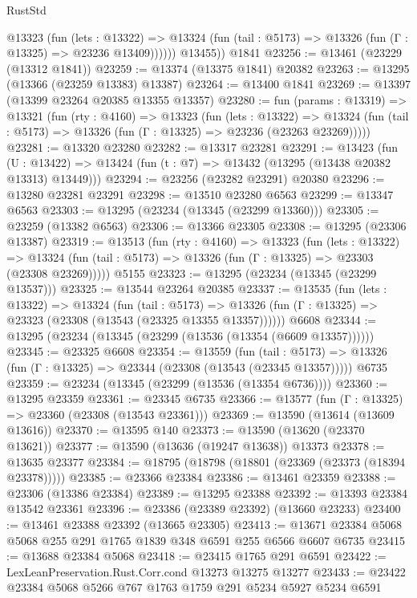 \begin{lexlean}{RustStd}
\begin{coremodule}
            @13323
              (fun (lets : @13322) =>
              @13324 (fun (tail : @5173) => @13326 (fun (Γ : @13325) => @23236 @13409))))))
        @13455))
    @1841
@23256 := @13461 (@23229 (@13312 @1841))
@23259 := @13374 (@13375 @1841) @20382
@23263 := @13295 (@13366 (@23259 @13383) @13387)
@23264 := @13400 @1841
@23269 := @13397 (@13399 @23264 @20385 @13355 @13357)
@23280 := fun (params : @13319) =>
  @13321
    (fun (rty : @4160) =>
    @13323
      (fun (lets : @13322) =>
      @13324 (fun (tail : @5173) => @13326 (fun (Γ : @13325) => @23236 (@23263 @23269)))))
@23281 := @13320 @23280
@23282 := @13317 @23281
@23291 := @13423
    (fun (U : @13422) => @13424 (fun (t : @7) => @13432 (@13295 (@13438 @20382 @13313) @13449)))
@23294 := @23256 (@23282 @23291) @20380
@23296 := @13280 @23281 @23291
@23298 := @13510 @23280 @6563
@23299 := @13347 @6563
@23303 := @13295 (@23234 (@13345 (@23299 @13360)))
@23305 := @23259 (@13382 @6563)
@23306 := @13366 @23305
@23308 := @13295 (@23306 @13387)
@23319 := @13513
    (fun (rty : @4160) =>
    @13323
      (fun (lets : @13322) =>
      @13324 (fun (tail : @5173) => @13326 (fun (Γ : @13325) => @23303 (@23308 @23269)))))
    @5155
@23323 := @13295 (@23234 (@13345 (@23299 @13537)))
@23325 := @13544 @23264 @20385
@23337 := @13535
    (fun (lets : @13322) =>
    @13324
      (fun (tail : @5173) =>
      @13326 (fun (Γ : @13325) => @23323 (@23308 (@13543 (@23325 @13355 @13357))))))
    @6608
@23344 := @13295 (@23234 (@13345 (@23299 (@13536 (@13354 (@6609 @13357))))))
@23345 := @23325 @6608
@23354 := @13559
    (fun (tail : @5173) => @13326 (fun (Γ : @13325) => @23344 (@23308 (@13543 (@23345 @13357)))))
    @6735
@23359 := @23234 (@13345 (@23299 (@13536 (@13354 @6736))))
@23360 := @13295 @23359
@23361 := @23345 @6735
@23366 := @13577 (fun (Γ : @13325) => @23360 (@23308 (@13543 @23361)))
@23369 := @13590 (@13614 (@13609 @13616))
@23370 := @13595 @140
@23373 := @13590 (@13620 (@23370 @13621))
@23377 := @13590 (@13636 (@19247 @13638)) @13373
@23378 := @13635 @23377
@23384 := @18795 (@18798 (@18801 (@23369 (@23373 (@18394 @23378)))))
@23385 := @23366 @23384
@23386 := @13461 @23359
@23388 := @23306 (@13386 @23384)
@23389 := @13295 @23388
@23392 := @13393 @23384 @13542 @23361
@23396 := @23386 (@23389 @23392) (@13660 @23233)
@23400 := @13461 @23388 @23392 (@13665 @23305)
@23413 := @13671 @23384 @5068 @5068 @255 @291 @1765 @1839 @348 @6591 @255 @6566 @6607 @6735
@23415 := @13688 @23384 @5068
@23418 := @23415 @1765 @291 @6591
@23422 := LexLeanPreservation.Rust.Corr.cond @13273 @13275 @13277
@23433 := @23422 @23384 @5068 @5266 @767 @1763 @1759 @291 @5234 @5927 @5234 @6591

\end{coremodule}
\end{lexlean}
